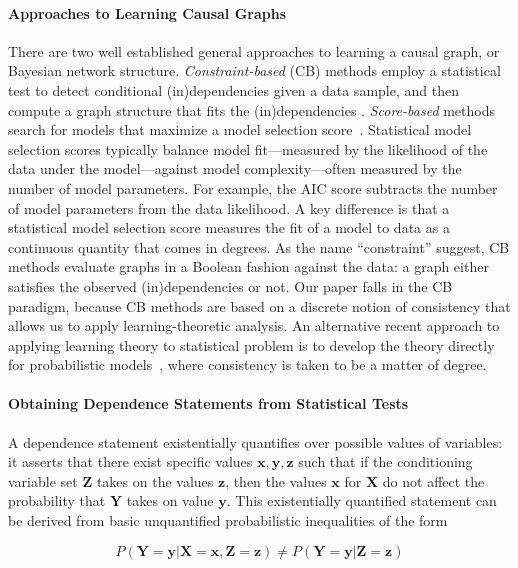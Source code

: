 \documentclass{elsarticle}%
\newcommand{\set}[1]{\mathbf{#1}}
\newcommand{\X}{X}
\newcommand{\Y}{Y}
\newcommand{\x}{x}
\newcommand{\y}{y}
\newcommand{\z}{z}
\begin{document}
\paragraph{Approaches to Learning Causal Graphs}
There are two well established general approaches to learning a causal graph, or Bayesian network structure. {\em Constraint-based} (CB) methods employ a statistical test to detect conditional (in)dependencies given a data sample, and then compute a graph structure that fits the (in)dependencies \cite{cooper99:_comput_causat_discov,peter00:_causat}. {\em Score-based} methods search for models that maximize a model selection score~\cite{Heckerman1998}. Statistical model selection scores typically balance model fit---measured by the likelihood of the data under the model---against model complexity---often measured by the number of model parameters. For example, the AIC score subtracts the number of model parameters from the data likelihood. A key difference is that a statistical model selection score measures the fit of a model to data as a continuous quantity that comes in degrees. As the name ``constraint'' suggest, CB methods evaluate graphs in a Boolean fashion against the data: a graph either satisfies the observed (in)dependencies or not. Our paper falls in the CB paradigm, because CB methods are based on a discrete notion of consistency that allows us to apply learning-theoretic analysis. An alternative recent approach to applying learning theory to statistical problem is to develop the theory directly for probabilistic models~\cite{Kelly2010,Genin2017}, where consistency is taken to be a matter of degree. 


\paragraph{Obtaining Dependence Statements from Statistical Tests}
A dependence statement existentially quantifies over possible values of variables: it asserts that there exist specific values $\set{\x},\set{\y},\set{\z}$ such that if   the conditioning variable set $\set{Z}$ takes on the values $\set{\z}$, then the values $\set{x}$ for $\set{\X}$ do not affect the probability that $\set{\Y}$ takes on value $\set{y}$. This existentially quantified statement can be derived from basic unquantified probabilistic inequalities of the form

\begin{equation} \label{eq:basic-ineq}
P(\set{\Y} = \set{\y}|\set{\X} = \set{\x},\set{Z} = \set{z}) \neq P(\set{\Y} = \set{\y}|\set{Z} = \set{z})
\end{equation}
\end{document}
